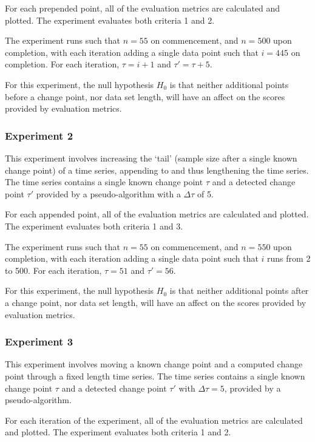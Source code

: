 \documentclass{uvamscse}	%
\begin{document}
For each prepended point, all of the evaluation metrics are calculated and plotted. The experiment evaluates both criteria 1 and 2.

The experiment runs such that $n = 55$ on commencement, and $n = 500$ upon completion, with each iteration adding a single data point such that $i = 445$ on completion. For each iteration, $\tau = i + 1$ and $\tau' = \tau + 5$.

For this experiment, the null hypothesis $H_0$ is that neither additional points before a change point, nor data set length, will have an affect on the scores provided by evaluation metrics.


\subsubsection{Experiment 2}

This experiment involves increasing the `tail' (sample size after a single known change point) of a time series, appending to and thus lengthening the time series. The time series contains a single known change point $\tau$ and a detected change point $\tau'$ provided by a pseudo-algorithm with a $\Delta \tau$ of 5.

For each appended point, all of the evaluation metrics are calculated and plotted. The experiment evaluates both criteria 1 and 3.

The experiment runs such that $n=55$ on commencement, and $n=550$ upon completion, with each iteration adding a single data point such that $i$ runs from 2 to 500. For each iteration, $\tau = 51$ and $\tau' = 56$.

For this experiment, the null hypothesis $H_0$ is that neither additional points after a change point, nor data set length, will have an affect on the scores provided by evaluation metrics.

\subsubsection{Experiment 3}

This experiment involves moving a known change point and a computed change point through a fixed length time series. The time series contains a single known change point $\tau$ and a detected change point $\tau'$ with $\Delta \tau = 5$, provided by a pseudo-algorithm.

For each iteration of the experiment, all of the evaluation metrics are calculated and plotted. The experiment evaluates both criteria 1 and 2.
\end{document}
